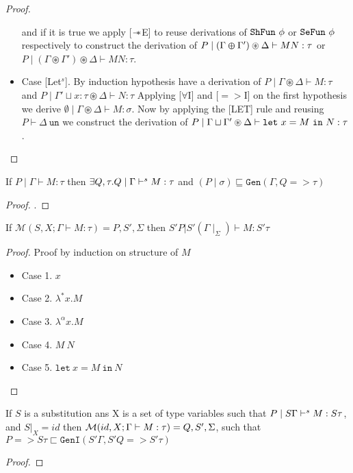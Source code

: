 \begin{proof}
\begin{itemize}
    and if it is true we apply [$\mathrel{-\mkern-6mu*}$E] to reuse derivations of $\texttt{ShFun}\ \phi$ or $\texttt{SeFun}\ \phi$ respectively to construct the derivation
    of $P \mid (\Gamma \varoplus \Gamma') \circledast \Delta \vdash M N:\tau$ or $P \mid (\Gamma \circledast \Gamma') \circledast \Delta \vdash M N:\tau$.
  \item{Case [Let$^s$].}
    By induction hypothesis have a derivation of $P \mid \Gamma \circledast \Delta \vdash M: \tau$ and $P \mid \Gamma' \sqcup x:\tau \circledast \Delta \vdash N:\tau$
    Applying [$\forall$I] and [$=>$I] on the first hypothesis we derive $\emptyset \mid \Gamma \circledast \Delta \vdash M: \sigma$. Now by applying
    the [LET] rule and reusing $P \vdash \Delta\ \texttt{un}$ we construct the derivation of
    $P \mid \Gamma \sqcup \Gamma' \circledast \Delta \vdash \texttt{let}\ x = M\ \texttt{in}\ N:\tau$.
  \end{itemize}
\end{proof}

\begin{theorem}\label{thm:completeness-syntax-directed}
  If $P \mid \Gamma \vdash M:\tau$ then
  $\exists Q,\tau. Q \mid \Gamma \vdash^s M:\tau$
  and $(P \mid \sigma) \sqsubseteq \texttt{Gen}(\Gamma, Q => \tau)$
\end{theorem}
\begin{proof}
  .
\end{proof}

\begin{theorem}
   If $\mathcal{M}(S, X; \Gamma \vdash M : \tau) = P, S', \Sigma$ then $S' P | S' (\Gamma\mid_{\Sigma}) \vdash M : S' \tau$
\end{theorem}
\begin{proof}
  Proof by induction on structure of $M$
  \begin{itemize}
  \item Case 1. $x$
  \item Case 2. $\lambda^{*} x. M$
  \item Case 3. $\lambda ^{\alpha}x. M$
  \item Case 4. $M\ N$
  \item Case 5. $\texttt{let}\ x = M\ \texttt{in}\ N$
  \end{itemize}
\end{proof}

\begin{theorem}[Completeness of $\M$.]
  If $S$ is a substitution ans X is a set of type variables such that
  $P \mid S\Gamma \vdash^s M: S\tau$, and $S|_X = id$ then $\mathcal{M}(id, X; \Gamma \vdash M:\tau) = Q, S', \Sigma$, such that
  $P => S\tau \sqsubset \texttt{GenI}(S'\Gamma, S' Q => S' \tau)$
\end{theorem}
\begin{proof}
\end{proof}

